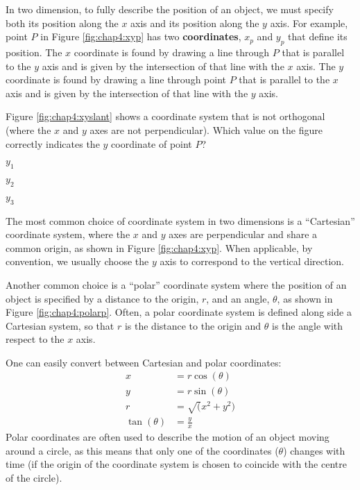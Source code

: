 In two dimension, to fully describe the position of an object, we must specify both its position along the $x$ axis and its position along the $y$ axis. For example, point $P$ in Figure \ref{fig:chap4:xyp} has two \textbf{coordinates}, $x_p$ and $y_p$ that define its position. The $x$ coordinate is found by drawing a line through $P$ that is parallel to the $y$ axis and is given by the intersection of that line with the $x$ axis. The $y$ coordinate is found by drawing a line through point $P$ that is parallel to the $x$ axis and is given by the intersection of that line with the $y$ axis.


\begin{checkpointMC}{Figure \ref{fig:chap4:xyslant} shows a coordinate system that is not orthogonal (where the $x$ and $y$ axes are not perpendicular). Which value on the figure correctly indicates the $y$ coordinate of point $P$?
}
\item $y_1$ %
\item $y_2$
\item $y_3$
\end{checkpointMC}
The most common choice of coordinate system in two dimensions is a ``Cartesian'' coordinate system, where the $x$ and $y$ axes are perpendicular and share a common origin, as shown in Figure \ref{fig:chap4:xyp}. When applicable, by convention, we usually choose the $y$ axis to correspond to the vertical direction.

Another common choice is a ``polar'' coordinate system where the position of an object is specified by a distance to the origin, $r$, and an angle, $\theta$, as shown in Figure \ref{fig:chap4:polarp}. Often, a polar coordinate system is defined along side a Cartesian system, so that $r$ is the distance to the origin and $\theta$ is the angle with respect to the $x$ axis.

One can easily convert between Cartesian and polar coordinates:
\begin{align*}
x&=r\cos(\theta)\\
y&=r\sin(\theta)\\
r&=\sqrt(x^2+y^2)\\
\tan(\theta) &= \frac{y}{x}
\end{align*}
Polar coordinates are often used to describe the motion of an object moving around a circle, as this means that only one of the coordinates ($\theta$) changes with time (if the origin of the coordinate system is chosen to coincide with the centre of the circle).
